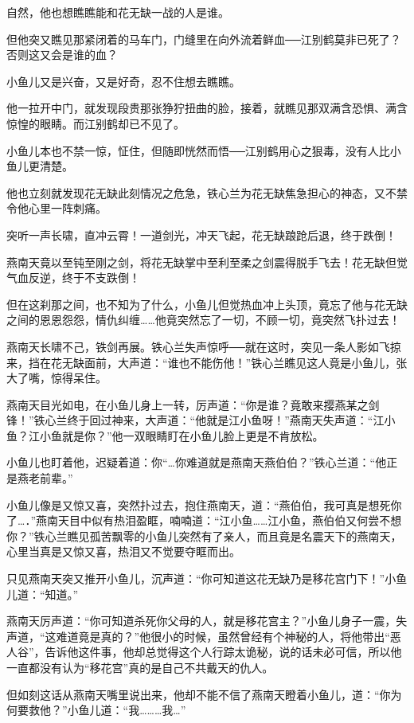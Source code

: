 \documentclass[12pt,oneside]{book}
\begin{document}
自然，他也想瞧瞧能和花无缺一战的人是谁。

但他突又瞧见那紧闭着的马车门，门缝里在向外流着鲜血──江别鹤莫非已死了？否则这又会是谁的血？

小鱼儿又是兴奋，又是好奇，忍不住想去瞧瞧。

他一拉开中门，就发现段贵那张狰狞扭曲的脸，接着，就瞧见那双满含恐惧、满含惊惶的眼睛。而江别鹤却已不见了。

小鱼儿本也不禁一惊，怔住，但随即恍然而悟──江别鹤用心之狠毒，没有人比小鱼儿更清楚。

他也立刻就发现花无缺此刻情况之危急，铁心兰为花无缺焦急担心的神态，又不禁令他心里一阵刺痛。

突听一声长啸，直冲云霄！一道剑光，冲天飞起，花无缺踉跄后退，终于跌倒！

燕南天竟以至钝至刚之剑，将花无缺掌中至利至柔之剑震得脱手飞去！花无缺但觉气血反逆，终于不支跌倒！

但在这刹那之间，也不知为了什么，小鱼儿但觉热血冲上头顶，竟忘了他与花无缺之间的恩恩怨怨，情仇纠缠\ldots\ldots 他竟突然忘了一切，不顾一切，竟突然飞扑过去！

燕南天长啸不己，铁剑再展。铁心兰失声惊呼──就在这时，突见一条人影如飞掠来，挡在花无缺面前，大声道：``谁也不能伤他！''铁心兰瞧见这人竟是小鱼儿，张大了嘴，惊得呆住。

燕南天目光如电，在小鱼儿身上一转，厉声道：``你是谁？竟敢来撄燕某之剑锋！''铁心兰终于回过神来，大声道：``他就是江小鱼呀！''燕南天失声道：``江小鱼？江小鱼就是你？''他一双眼睛盯在小鱼儿脸上更是不肯放松。

小鱼儿也盯着他，迟疑着道：你``\ldots 你难道就是燕南天燕伯伯？''铁心兰道：``他正是燕老前辈。''

小鱼儿像是又惊又喜，突然扑过去，抱住燕南天，道：``燕伯伯，我可真是想死你了\ldots．''燕南天目中似有热泪盈眶，喃喃道：``江小鱼\ldots\ldots 江小鱼，燕伯伯又何尝不想你？''铁心兰瞧见孤苦飘零的小鱼儿突然有了亲人，而且竟是名震天下的燕南天，心里当真是又惊又喜，热泪又不觉要夺眶而出。

只见燕南天突又推开小鱼儿，沉声道：``你可知道这花无缺乃是移花宫门下！''小鱼儿道：``知道。''

燕南天厉声道：``你可知道杀死你父母的人，就是移花宫主？''小鱼儿身子一震，失声道，``这难道竟是真的？''他很小的时候，虽然曾经有个神秘的人，将他带出``恶人谷''，告诉他这件事，他却总觉得这个人行踪太诡秘，说的话未必可信，所以他一直都没有认为``移花宫''真的是自己不共戴天的仇人。

但如刻这话从燕南天嘴里说出来，他却不能不信了燕南天瞪着小鱼儿，道：``你为何要救他？''小鱼儿道：``我\ldots\ldots\ldots 我\ldots{}''
\end{document}
